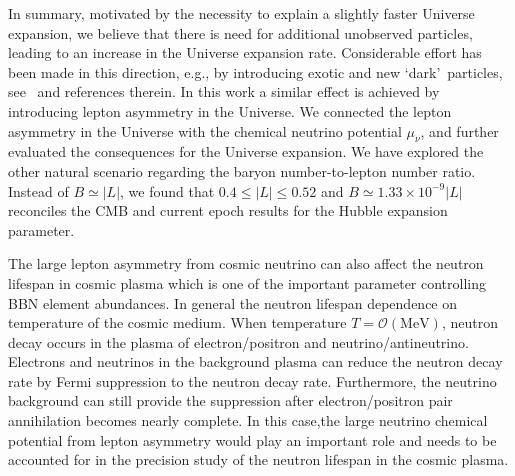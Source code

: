 In summary, motivated by the necessity to explain a slightly faster Universe expansion, we believe that there is need for additional unobserved particles,  leading to an increase  in the Universe expansion rate. Considerable effort has been made in this direction, e.g., by introducing exotic and new \lq dark\rq\ particles, see~\cite{Birrell:2014cja} and references therein. In this work a similar effect is achieved by introducing lepton asymmetry in the Universe. We connected the lepton asymmetry in the Universe with the chemical neutrino potential $\mu_\nu$,
and further evaluated the consequences for the Universe expansion. We have explored the other natural scenario regarding the baryon number-to-lepton number ratio. Instead of $B\simeq |L|$, we found that $0.4\leqslant|L| \leqslant0.52$ and $B\simeq 1.33\times 10^{-9}|L|$ reconciles the CMB and current epoch results for the Hubble expansion parameter.

The large lepton asymmetry from cosmic neutrino can also affect the neutron lifespan in cosmic plasma which is one of the important parameter controlling BBN element abundances. 
In general the neutron lifespan dependence on temperature of the cosmic medium. When temperature $T=\mathcal{O}(\mathrm{MeV})$, neutron decay occurs in the plasma of electron/positron and 
 neutrino/antineutrino. Electrons and neutrinos in the background plasma can reduce the neutron decay rate by Fermi suppression to the neutron decay rate. Furthermore, the neutrino background can still provide the suppression after electron/positron pair annihilation becomes nearly complete. In this case,the large neutrino chemical potential from lepton asymmetry would play an important role and needs to be accounted for in the precision study of the neutron lifespan in the cosmic plasma.
